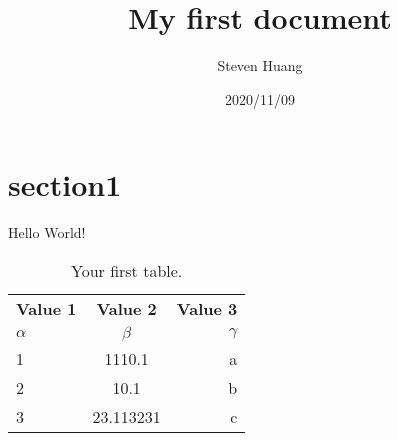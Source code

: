 \documentclass{article}
\title{ My first document}
\date{2020/11/09}
\author{Steven Huang}
\begin{document}
\maketitle
\newpage
{}

\section{section1}
Hello World!

\begin{table}[h!]
  \begin{center}
    \caption{Your first table.}
    \label{tab:table1}
    \begin{tabular}{l|c|r} %
      \textbf{Value 1} & \textbf{Value 2} & \textbf{Value 3}\\
      $\alpha$ & $\beta$ & $\gamma$ \\
      \hline
      1 & 1110.1 & a\\
      2 & 10.1 & b\\
      3 & 23.113231 & c\\
    \end{tabular}
  \end{center}
\end{table}
\end{document}

